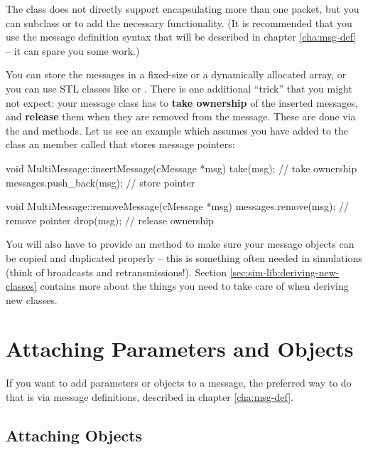 The  class does not directly support encapsulating more
than one packet, but you can subclass  or 
to add the necessary functionality. (It is recommended that you
use the message definition syntax that will be described in chapter
\ref{cha:msg-def} -- it can spare you some work.)

You can store the messages in a fixed-size or a dynamically allocated
array, or you can use STL classes like  or .
There is one additional ``trick'' that you might not expect: your message
class has to \textbf{take ownership} of the inserted messages, and
\textbf{release} them when they are removed from the message. These are
done via the  and  methods. Let us see
an example which assumes you have added to the class an  member
called  that stores message pointers:

\begin{cpp}
void MultiMessage::insertMessage(cMessage *msg)
{
    take(msg);  // take ownership
    messages.push_back(msg);  // store pointer
}

void MultiMessage::removeMessage(cMessage *msg)
{
    messages.remove(msg);  // remove pointer
    drop(msg);  // release ownership
}
\end{cpp}

You will also have to provide an  method to
make sure your message objects can be copied and duplicated
properly -- this is something often needed in simulations
(think of broadcasts and retransmissions!). Section
\ref{sec:sim-lib:deriving-new-classes} contains more
about the things you need to take care of when deriving new classes.



\section{Attaching Parameters and Objects}
\label{sec:msgs:attaching-objects}

If you want to add parameters or objects to a message, the preferred
way to do that is via message definitions, described in chapter
\ref{cha:msg-def}.


\subsection{Attaching Objects}
\label{sec:messages:attaching-objects}

